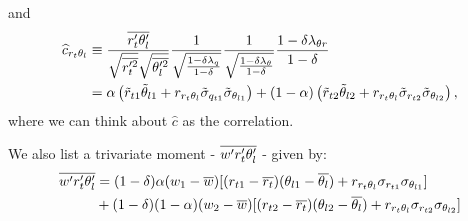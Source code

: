and
\begin{align}
    \widehat{c}_{r_t \theta_l}
    &\equiv\frac{\overline{r_t' \theta_l'}}{\sqrt{\overline{r_t'^2}}\sqrt{\overline{\theta_l'^2}}} \frac{1}{\sqrt{\frac{1-\delta \lambda_q}{1-\delta}}}\frac{1}{\sqrt{\frac{1-\delta \lambda_\theta}{1-\delta}}}\frac{1 - \delta \lambda_{\theta r} }{1 - \delta} \nonumber\\
    &= \alpha \left( \tilde{r}_{t1} \tilde{\theta}_{l1} + r_{r_t \theta_l} \tilde{\sigma}_{q_{t1}} \tilde{\sigma}_{\theta_{l1}} \right) + (1 - \alpha) \left( \tilde{r}_{t2} \tilde{\theta}_{l2} + r_{r_t \theta_l} \tilde{\sigma}_{r_{t2}} \tilde{\sigma}_{\theta_{l2}} \right),
    \label{eq:c_hat_r_t_theta_l_nondim}
\end{align}
where we can think about $\widehat{c}$ as the correlation.

We also list a trivariate moment - $\overline{w' r_t' \theta_l'}$ - given by:
\begin{align}
    \overline{w' r_t' \theta_l'}
    &= (1 - \delta) \alpha (w_1 - \overline{w}) [(r_{t1} - \overline{r_t}) (\theta_{l1} - \overline{\theta_l}) + r_{r_t \theta_l} \sigma_{r_{t1}} \sigma_{\theta_{l1}}] \nonumber\\
    &+ (1 - \delta) (1 - \alpha) (w_2 - \overline{w}) [(r_{t2} - \overline{r_t}) (\theta_{l2} - \overline{\theta_l}) + r_{r_t \theta_l} \sigma_{r_{t2}} \sigma_{\theta_{l2}}]
    \label{eq:w_prime_r_t_prime_t_l_prime_bar}
\end{align}